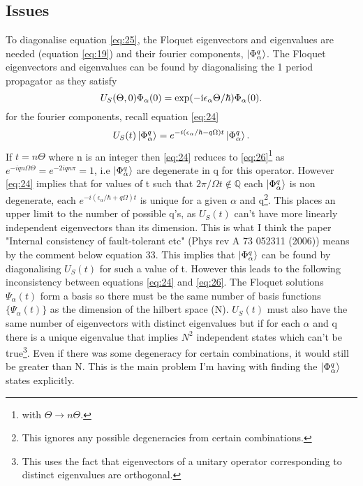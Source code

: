 \documentclass[10pt]{article}
\numberwithin{equation}{section}
\begin{document}
\subsection{Issues}
To diagonalise equation \ref{eq:25}, the Floquet eigenvectors and eigenvalues are needed (equation \ref{eq:19}) and their fourier components, $\ket{\Phi_{\alpha}^{q}}$. The Floquet eigenvectors and eigenvalues can be found by diagonalising the 1 period propagator as they satisfy
\begin{equation} \label{eq:26}
U_{S}(\Theta,0)\Phi_{\alpha}(0) = \rm exp(-i\epsilon_{\alpha}\Theta/\hbar)\Phi_{\alpha}(0).
\end{equation}
for the fourier components, recall equation \ref{eq:24}
\begin{equation} \label{eq:24}
U_{S}(t)\ket{\Phi_{\alpha}^{q}} =  e^{-i(\epsilon_{\alpha}/\hbar-q\Omega)t} \ket{\Phi_{\alpha}^{q}}. 
\end{equation}
If $t = n\Theta$ where n is an integer then \ref{eq:24} reduces to \ref{eq:26}\footnote{with $\Theta \rightarrow n\Theta$.} as $ e^{-iqn\Omega\Theta}=e^{-2iqn\pi}=1 $, i.e  $\ket{\Phi_{\alpha}^{q}}$ are degenerate in q for this operator. However \ref{eq:24} implies that for values of t such that $2\pi/\Omega t \not\in \mathbb{Q}$ each $ \ket{\Phi_{\alpha}^{q}}$ is non degenerate, each $ e^{-i(\epsilon_{\alpha}/\hbar+q\Omega)t}$ is unique for a given $\alpha$ and q\footnote{This ignores any possible degeneracies from certain combinations.}. This places an upper limit to the number of possible q's, as $U_{S}(t)$ can't have more linearly independent eigenvectors than its dimension. This is what I think the paper "Internal consistency of fault-tolerant etc" (Phys rev A 73 052311 (2006)) means by the comment below equation 33.  This implies that $ \ket{\Phi_{\alpha}^{q}} $ can be found by diagonalising $U_{S}(t)$ for such a value of t. However this leads to the following inconsistency between equations \ref{eq:24} and \ref{eq:26}. The Floquet solutions $\Psi_{\alpha}(t)$ form a basis so there must be the same number of basis functions $\{\Psi_{\alpha}(t)\}$ as the dimension of the hilbert space (N). $U_{S}(t)$ must also have the same number of eigenvectors with distinct eigenvalues but
if for each $\alpha$ and q there is a unique eigenvalue that implies $N^2$ independent states which can't be true\footnote{This uses the fact that eigenvectors of a unitary operator corresponding to distinct eigenvalues are orthogonal.}. Even if there was some degeneracy for certain combinations, it would still be greater than N. This is the main problem I'm having with finding the $\ket{\Phi_{\alpha}^{q}}$ states explicitly.
\end{document}
